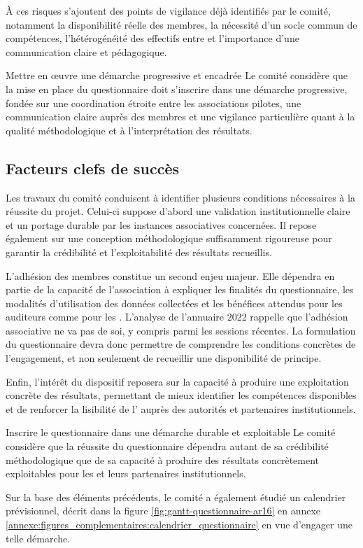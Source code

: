 À ces risques s'ajoutent des points de vigilance déjà identifiés par le comité, notamment la disponibilité réelle des membres, la nécessité d'un socle commun de compétences, l'hétérogénéité des effectifs entre \AssociationsRegionalesIHEDN{} et l'importance d'une communication claire et pédagogique.

\begin{subproposition}{Mettre en œuvre une démarche progressive et encadrée}
Le comité considère que la mise en place du questionnaire doit s'inscrire dans une démarche progressive, fondée sur une coordination étroite entre les associations pilotes, une communication claire auprès des membres et une vigilance particulière quant à la qualité méthodologique et à l'interprétation des résultats.
\end{subproposition}

\subsection{Facteurs clefs de succès}

Les travaux du comité conduisent à identifier plusieurs conditions nécessaires à la réussite du projet. Celui-ci suppose d'abord une validation institutionnelle claire et un portage durable par les instances associatives concernées. Il repose également sur une conception méthodologique suffisamment rigoureuse pour garantir la crédibilité et l'exploitabilité des résultats recueillis.

L'adhésion des membres constitue un second enjeu majeur. Elle dépendra en partie de la capacité de l'association à expliquer les finalités du questionnaire, les modalités d'utilisation des données collectées et les bénéfices attendus pour les auditeurs comme pour les \AssociationsUnionIHEDN. L'analyse de l'annuaire 2022 rappelle que l'adhésion associative ne va pas de soi, y compris parmi les sessions récentes. La formulation du questionnaire devra donc permettre de comprendre les conditions concrètes de l'engagement, et non seulement de recueillir une disponibilité de principe.

Enfin, l'intérêt du dispositif reposera sur la capacité à produire une exploitation concrète des résultats, permettant de mieux identifier les compétences disponibles et de renforcer la lisibilité de l'\ARSeize{} auprès des autorités et partenaires institutionnels.

\begin{subproposition}{Inscrire le questionnaire dans une démarche durable et exploitable}
Le comité considère que la réussite du questionnaire dépendra autant de sa crédibilité méthodologique que de sa capacité à produire des résultats concrètement exploitables pour les \AssociationsUnionIHEDN{} et leurs partenaires institutionnels.
\end{subproposition}

Sur la base des éléments précédents, le comité a également étudié un calendrier prévisionnel, décrit dans la figure \ref{fig:gantt-questionnaire-ar16} en annexe \ref{annexe:figures_complementaires:calendrier_questionnaire} en vue d'engager une telle démarche.
